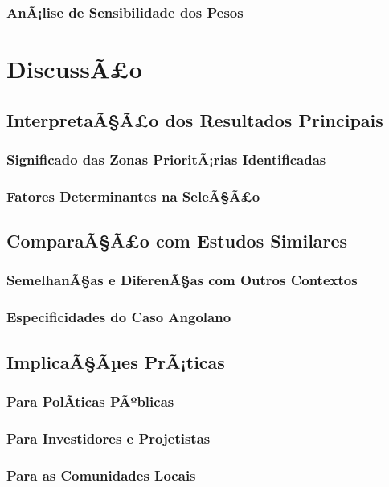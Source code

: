 \documentclass[12pt, a4paper]{article}
\begin{document}
\subsubsection{AnÃ¡lise de Sensibilidade dos Pesos}

\section{DiscussÃ£o}
\subsection{InterpretaÃ§Ã£o dos Resultados Principais}
\subsubsection{Significado das Zonas PrioritÃ¡rias Identificadas}
\subsubsection{Fatores Determinantes na SeleÃ§Ã£o}

\subsection{ComparaÃ§Ã£o com Estudos Similares}
\subsubsection{SemelhanÃ§as e DiferenÃ§as com Outros Contextos}
\subsubsection{Especificidades do Caso Angolano}

\subsection{ImplicaÃ§Ãµes PrÃ¡ticas}
\subsubsection{Para PolÃ­ticas PÃºblicas}
\subsubsection{Para Investidores e Projetistas}
\subsubsection{Para as Comunidades Locais}
\end{document}
